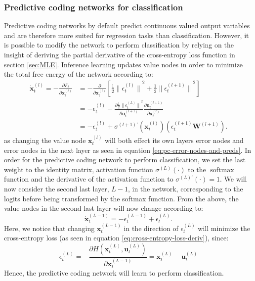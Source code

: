 \documentclass[a4paper,11pt]{article} %
\DeclareMathOperator{\softmax}{softmax}
\begin{document}
\subsubsection{Predictive coding networks for classification}
Predictive coding networks by default predict continuous valued output variables and are therefore more suited for regression tasks than classification. However, it is possible to modify the network to perform classification by relying on the insight of deriving the partial derivative of the cross-entropy loss function in section \ref{sec:MLE}. Inference learning updates value nodes in order to minimize the total free energy of the network according to:
\begin{equation} \label{eq:value-node-derivative}
  \begin{split}
  \dot{\mathbf{x}}_t^{(l)} = -\frac{\partial F_t}{\partial \mathbf{x}_t^{(l)}} & = - \frac{\partial }{\partial \mathbf{x}_t^{(l)}} \left[ \frac{1}{2} {\lVert \epsilon_t^{(l)} \rVert}^2 + \frac{1}{2} {\lVert \epsilon_t^{(l+1)} \rVert}^2  \right] \\
  & = -\epsilon_t^{(l)} - \frac{\partial \frac{1}{2} {\lVert \epsilon_t^{(L)} \rVert}^2}{\partial \mathbf{u}_t^{(l+1)}} \frac{\partial \mathbf{u}_t^{(l+1)}}{\partial \mathbf{x}_t^{(l)}} \\
  & = -\epsilon_{t}^{(l)}+\sigma^{(l+1)\prime}(\mathbf{x}_{t}^{(l)})(\epsilon_{t}^{(l+1)} \mathbf{W}^{(l+1)}).
  \end{split}
\end{equation}
as changing the value node $\mathbf{x}_t^{(l)}$ will both effect its own layers error nodes and error nodes in the next layer as seen in equation \ref{eq:pc-error-nodes-and-preds}. In order for the predictive coding network to perform classification, we set the last weight to the identity matrix, activation function $\sigma^{(L)}(\cdot)$ to the $\softmax$ function and the derivative of the activation function to $\sigma^{(L)\prime}(\cdot) = 1$. We will now consider the second last layer, $L-1$, in the network, corresponding to the logits before being transformed by the softmax function. From the above, the value nodes in the second last layer will now change according to:
\begin{equation}
  \dot{\mathbf{x}}_{t}^{(L-1)} = -\epsilon_{t}^{(L-1)} + \epsilon_{t}^{(L)}.
\end{equation}
Here, we notice that changing $\mathbf{x}_t^{(L-1)}$ in the direction of $\epsilon_{t}^{(L)}$ will minimize the cross-entropy loss (as seen in equation \ref{eq:cross-entropy-loss-deriv}), since:
\begin{equation}
  \epsilon_{t}^{(L)} = -\frac{\partial H(\mathbf{x}_t^{(L)}, \mathbf{u}_t^{(L)})}{\partial \mathbf{x}_t^{(L-1)}} = \mathbf{x}_t^{(L)} - \mathbf{u}_t^{(L)}
\end{equation}
Hence, the predictive coding network will learn to perform classification. 
\end{document}
